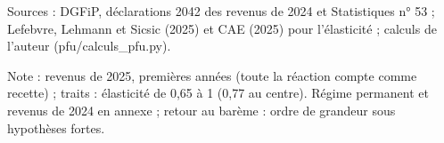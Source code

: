Sources : DGFiP, déclarations 2042 des revenus de 2024 et Statistiques n° 53 ; Lefebvre, Lehmann et Sicsic (2025) et CAE (2025) pour l'élasticité ; calculs de l'auteur (pfu/calculs\_pfu.py).\par Note : revenus de 2025, premières années (toute la réaction compte comme recette) ; traits : élasticité de 0,65 à 1 (0,77 au centre). Régime permanent et revenus de 2024 en annexe ; retour au barème : ordre de grandeur sous hypothèses fortes.
